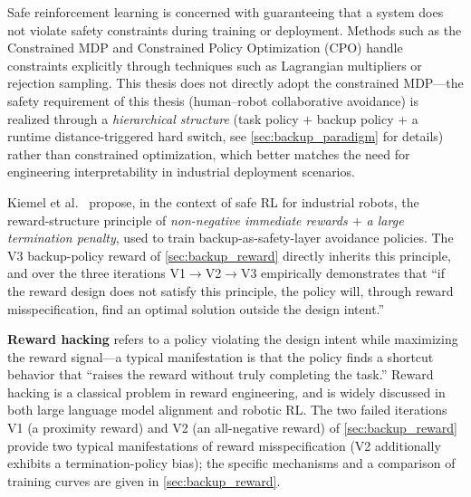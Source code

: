 Safe reinforcement learning is concerned with guaranteeing that a system does not violate safety constraints during training or deployment. Methods such as the Constrained MDP and Constrained Policy Optimization (CPO) handle constraints explicitly through techniques such as Lagrangian multipliers or rejection sampling. This thesis does not directly adopt the constrained MDP---the safety requirement of this thesis (human--robot collaborative avoidance) is realized through a \emph{hierarchical structure} (task policy $+$ backup policy $+$ a runtime distance-triggered hard switch, see \cref{sec:backup_paradigm} for details) rather than constrained optimization, which better matches the need for engineering interpretability in industrial deployment scenarios.

Kiemel et al.~\cite{kiemel2024safe} propose, in the context of safe RL for industrial robots, the reward-structure principle of \emph{non-negative immediate rewards $+$ a large termination penalty}, used to train backup-as-safety-layer avoidance policies. The V3 backup-policy reward of \cref{sec:backup_reward} directly inherits this principle, and over the three iterations V1$\to$V2$\to$V3 empirically demonstrates that ``if the reward design does not satisfy this principle, the policy will, through reward misspecification, find an optimal solution outside the design intent.''

\textbf{Reward hacking} refers to a policy violating the design intent while maximizing the reward signal---a typical manifestation is that the policy finds a shortcut behavior that ``raises the reward without truly completing the task.'' Reward hacking is a classical problem in reward engineering, and is widely discussed in both large language model alignment and robotic RL. The two failed iterations V1 (a proximity reward) and V2 (an all-negative reward) of \cref{sec:backup_reward} provide two typical manifestations of reward misspecification (V2 additionally exhibits a termination-policy bias); the specific mechanisms and a comparison of training curves are given in \cref{sec:backup_reward}.
